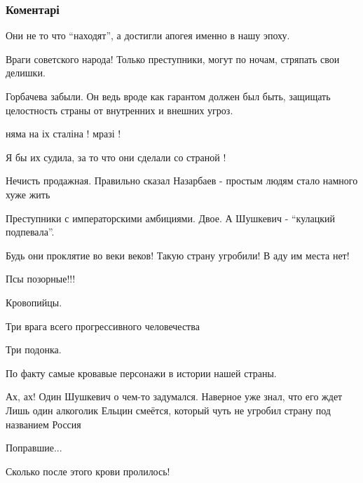  
 
 
 
 
\subsubsection{Коментарі}

\begin{itemize} %
Они не то что \enquote{находят}, а достигли апогея именно в нашу эпоху.

Враги советского народа! Только преступники, могут по ночам, стряпать свои делишки.

Горбачева забыли. Он ведь вроде как гарантом должен был быть, защищать целостность страны от внутренних и внешних угроз.

няма на іх сталіна ! мразі !

Я бы их судила, за то что они сделали со страной !

Нечисть продажная. Правильно сказал Назарбаев - простым людям стало намного хуже жить

Преступники с императорскими амбициями. Двое. А Шушкевич - \enquote{кулацкий подпевала}.

Будь они проклятие во веки веков! Такую страну угробили! В аду им места нет!

Псы позорные!!!

Кровопийцы.

Три врага всего прогрессивного человечества

Три подонка.

По факту самые кровавые персонажи в истории нашей страны.

Ах, ах! Один Шушкевич о чем-то задумался. Наверное уже знал, что его ждет
Лишь один алкоголик Ельцин смеётся, который чуть не угробил страну под названием Россия

Поправшие...

Сколько после этого крови пролилось!


\end{itemize}
